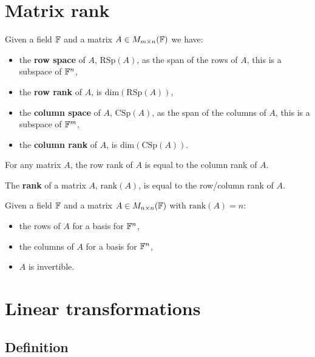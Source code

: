\documentclass[../Year1.tex]{subfiles}
\begin{document}
\section{Matrix rank}
\begin{definition}
    Given a field $\mathbb{F}$ and a matrix $A\in M_{m\times n}(\mathbb{F})$ we have: \begin{itemize}
        \item the \textbf{row space} of $A$, $\text{RSp}(A)$, as the span of the rows of $A$, this is a subspace of $\mathbb{F}^n$,
        \item the \textbf{row rank} of $A$, is $\text{dim}(\text{RSp}(A))$,
        \item the \textbf{column space} of $A$, $\text{CSp}(A)$, as the span of the columns of $A$, this is a subspace of $\mathbb{F}^m$,
        \item the \textbf{column rank} of $A$, is $\text{dim}(\text{CSp}(A))$.
    \end{itemize}
\end{definition}

\begin{theorem}
    For any matrix $A$, the row rank of $A$ is equal to the column rank of $A$.
\end{theorem}

\begin{definition}
    The \textbf{rank} of a matrix $A$, $\text{rank}(A)$, is equal to the row/column rank of $A$.
\end{definition}

 \begin{theorem}
     Given a field $\mathbb{F}$ and a matrix $A\in M_{n\times n}(\mathbb{F})$ with $\text{rank}(A)=n$: \begin{itemize}
         \item the rows of $A$ for a basis for $\mathbb{F}^n$,
         \item the columns of $A$ for a basis for $\mathbb{F}^n$,
         \item $A$ is invertible.
     \end{itemize}
 \end{theorem}


\section{Linear transformations}

\subsection{Definition}
\end{document}
